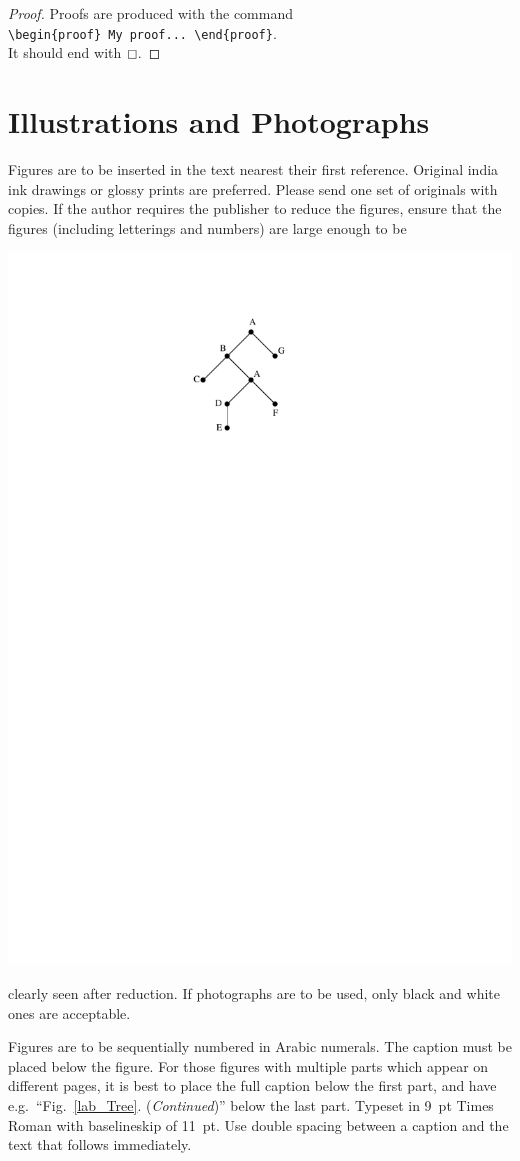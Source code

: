 \documentclass[11pt,twoside]{article}
\begin{document}
\begin{multicols}{2}
\begin{proof}
Proofs are produced with the command \\
\verb+\begin{proof} My proof... \end{proof}+.\\
It should end with\ $\qed$\kern0.3pt.
\end{proof}
\vspace*{-5pt}
\section{Illustrations and Photographs}

Figures are to be inserted in the text nearest their first reference. Original india ink drawings or glossy prints are preferred. Please send one set of originals with copies. If the author requires the publisher to reduce the figures, ensure that {the figures (including letterings and numbers) are large enough to be\hfilneg}


\begin{Figure}%
\includegraphics[width=.4\columnwidth]{figs/fig1} 
\label{lab_Tree}
\end{Figure}


\noindent
clearly seen after reduction. If photographs are to be used, only black and white ones are acceptable.

Figures are to be sequentially numbered in Arabic numerals. The caption must be placed below the figure. For those figures with multiple parts which appear on different pages, it is best to place the full caption below the first part, and have e.g.~``Fig.~\ref{lab_Tree}. ({\it Continued})'' below the last part. Typeset in 9~pt Times Roman with baselineskip of 11~pt. Use double spacing between a caption and the text that follows immediately.


\end{multicols}
\end{document}
